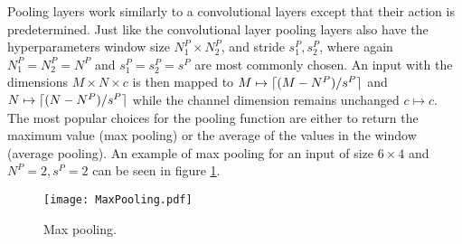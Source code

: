 
Pooling layers work similarly to a convolutional layers except that their action is predetermined. Just like the convolutional layer pooling layers also have the hyperparameters window size $N^P_1 \times N^P_2$, and stride $s_1^P,s_2^P$, where again $N^P_1 = N^P_2 = N^P$ and $s_1^P=s_2^P=s^P$ are most commonly chosen. An input with the  dimensions $M \times N \times c$ is then mapped to  $M \mapsto \lceil(M-N^P)/s^P\rceil $ and $N \mapsto \lceil(N-N^P)/s^P\rceil$ while the channel dimension remains unchanged $c \mapsto c$.\\

The most popular choices for the pooling function are either to return the maximum value (max pooling) or the average of the values in the window (average pooling). An example of max pooling for an input of size $6\times 4$ and $N^P = 2, s^P = 2$  can be seen in figure \ref{fig:MaxPooling}.\\

\begin{figure}[H]
\centering
\texttt{[image: MaxPooling.pdf]}
\caption{Max pooling.}
\label{fig:MaxPooling}
\end{figure}



